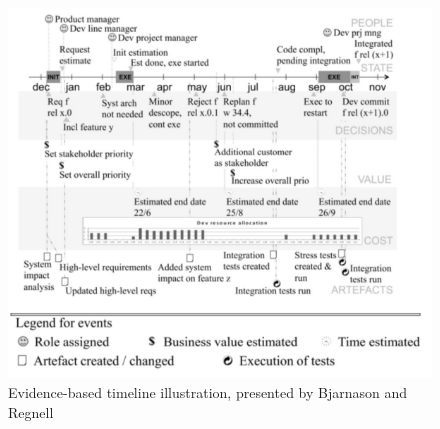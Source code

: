 \begin{figure}[!h]
	\centering
	\includegraphics[width=\textwidth, keepaspectratio]{figures/eb-timeline.png}
	\caption{Evidence-based timeline illustration, presented by Bjarnason and Regnell\cite{Bjarnason2012}}
	\label{figure:e-b-timeline}
\end{figure}